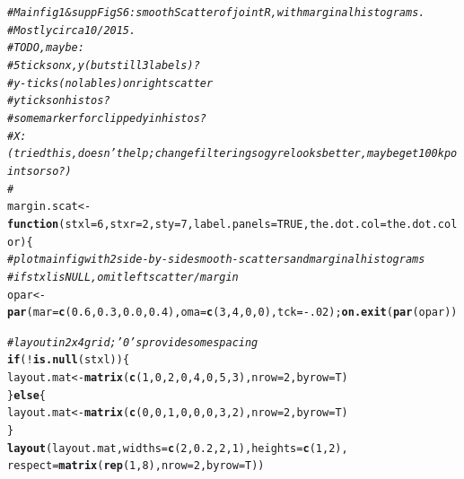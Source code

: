 \documentclass{article}\usepackage[]{graphicx}\usepackage[]{color}
\makeatletter
\newcommand{\hlnum}[1]{\textcolor[rgb]{0.686,0.059,0.569}{#1}}%
\newcommand{\hlcom}[1]{\textcolor[rgb]{0.678,0.584,0.686}{\textit{#1}}}%
\newcommand{\hlopt}[1]{\textcolor[rgb]{0,0,0}{#1}}%
\newcommand{\hlstd}[1]{\textcolor[rgb]{0.345,0.345,0.345}{#1}}%
\newcommand{\hlkwa}[1]{\textcolor[rgb]{0.161,0.373,0.58}{\textbf{#1}}}%
\newcommand{\hlkwb}[1]{\textcolor[rgb]{0.69,0.353,0.396}{#1}}%
\newcommand{\hlkwc}[1]{\textcolor[rgb]{0.333,0.667,0.333}{#1}}%
\newcommand{\hlkwd}[1]{\textcolor[rgb]{0.737,0.353,0.396}{\textbf{#1}}}%
\newenvironment{kframe}{%
 \def\at@end@of@kframe{}%
 \ifinner\ifhmode%
  \def\at@end@of@kframe{\end{minipage}}%
  \begin{minipage}{\columnwidth}%
 \fi\fi%
 \def\FrameCommand##1{\hskip\@totalleftmargin \hskip-\fboxsep
 \colorbox{shadecolor}{##1}\hskip-\fboxsep
     \hskip-\linewidth \hskip-\@totalleftmargin \hskip\columnwidth}%
 \MakeFramed {\advance\hsize-\width
   \@totalleftmargin\z@ \linewidth\hsize
   \@setminipage}}%
 {\par\unskip\endMakeFramed%
 \at@end@of@kframe}
\newenvironment{knitrout}{}{} %
\makeatother
\begin{document}
\begin{knitrout}\footnotesize
{}\color{fgcolor}\begin{kframe}
\begin{alltt}
\hlcom{# Main fig 1 & supp Fig S6: smoothScatter of joint R, with marginal histograms.}
\hlcom{# Mostly circa 10/2015.}
\hlcom{# TO DO, maybe: }
\hlcom{#   5 ticks on x,y (but still 3 labels)?}
\hlcom{#   y-ticks (no lables) on right scatter}
\hlcom{#   y ticks on histos?}
\hlcom{#   some marker for clipped y in histos?}
\hlcom{#   X: (tried this, doesn't help; change filtering so gyre looks better, maybe get 100 k points or so?)}
\hlcom{#   }
\hlstd{margin.scat} \hlkwb{<-} \hlkwa{function}\hlstd{(}\hlkwc{stxl}\hlstd{=}\hlnum{6}\hlstd{,} \hlkwc{stxr}\hlstd{=}\hlnum{2}\hlstd{,} \hlkwc{sty}\hlstd{=}\hlnum{7}\hlstd{,} \hlkwc{label.panels}\hlstd{=}\hlnum{TRUE}\hlstd{,} \hlkwc{the.dot.col}\hlstd{=the.dot.color)\{}
  \hlcom{# plot main fig with 2 side-by-side smooth-scatters and marginal histograms}
  \hlcom{# if stxl is NULL, omit left scatter/margin}
  \hlstd{opar} \hlkwb{<-} \hlkwd{par}\hlstd{(}\hlkwc{mar}\hlstd{=}\hlkwd{c}\hlstd{(}\hlnum{0.6}\hlstd{,}\hlnum{0.3}\hlstd{,}\hlnum{0.0}\hlstd{,}\hlnum{0.4}\hlstd{),}\hlkwc{oma}\hlstd{=}\hlkwd{c}\hlstd{(}\hlnum{3}\hlstd{,}\hlnum{4}\hlstd{,}\hlnum{0}\hlstd{,}\hlnum{0}\hlstd{),}\hlkwc{tck}\hlstd{=}\hlopt{-}\hlnum{.02}\hlstd{);} \hlkwd{on.exit}\hlstd{(}\hlkwd{par}\hlstd{(opar))}

  \hlcom{# layout in 2 x 4 grid; '0's provide some spacing}
  \hlkwa{if}\hlstd{(}\hlopt{!}\hlkwd{is.null}\hlstd{(stxl))\{}
    \hlstd{layout.mat} \hlkwb{<-} \hlkwd{matrix}\hlstd{(}\hlkwd{c}\hlstd{(}\hlnum{1}\hlstd{,}\hlnum{0}\hlstd{,}\hlnum{2}\hlstd{,}\hlnum{0}\hlstd{,}\hlnum{4}\hlstd{,}\hlnum{0}\hlstd{,}\hlnum{5}\hlstd{,}\hlnum{3}\hlstd{),}\hlkwc{nrow}\hlstd{=}\hlnum{2}\hlstd{,}\hlkwc{byrow}\hlstd{=T)}
  \hlstd{\}} \hlkwa{else} \hlstd{\{}
    \hlstd{layout.mat} \hlkwb{<-} \hlkwd{matrix}\hlstd{(}\hlkwd{c}\hlstd{(}\hlnum{0}\hlstd{,}\hlnum{0}\hlstd{,}\hlnum{1}\hlstd{,}\hlnum{0}\hlstd{,}\hlnum{0}\hlstd{,}\hlnum{0}\hlstd{,}\hlnum{3}\hlstd{,}\hlnum{2}\hlstd{),}\hlkwc{nrow}\hlstd{=}\hlnum{2}\hlstd{,}\hlkwc{byrow}\hlstd{=T)}
  \hlstd{\}}
  \hlkwd{layout}\hlstd{(layout.mat,} \hlkwc{widths}\hlstd{=}\hlkwd{c}\hlstd{(}\hlnum{2}\hlstd{,}\hlnum{0.2}\hlstd{,}\hlnum{2}\hlstd{,}\hlnum{1}\hlstd{),}\hlkwc{heights}\hlstd{=}\hlkwd{c}\hlstd{(}\hlnum{1}\hlstd{,}\hlnum{2}\hlstd{),}
         \hlkwc{respect}\hlstd{=}\hlkwd{matrix}\hlstd{(}\hlkwd{rep}\hlstd{(}\hlnum{1}\hlstd{,}\hlnum{8}\hlstd{),}\hlkwc{nrow}\hlstd{=}\hlnum{2}\hlstd{,}\hlkwc{byrow}\hlstd{=T))}


\end{alltt}
\end{kframe}
\end{knitrout}
\end{document}
